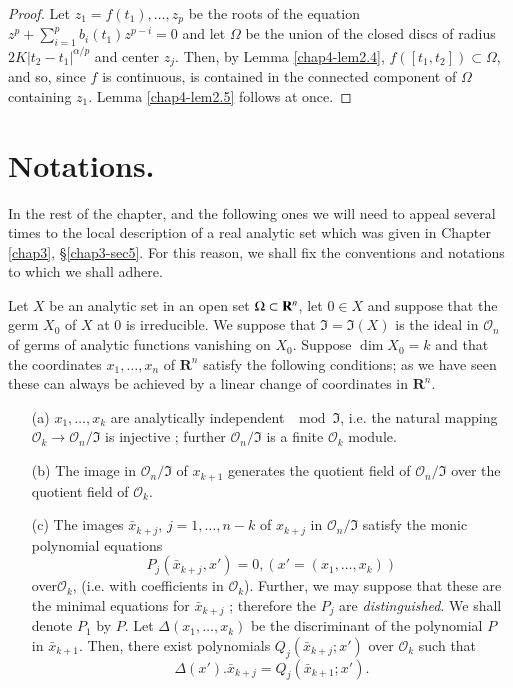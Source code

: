 \begin{proof}
Let $z_1 = f(t_1), \ldots, z_p$ be the roots of the equation $z^p + \sum\limits^p_{i=1} b_i (t_1) z^{p-i} =0$ and let $\Omega$ be the union of the closed discs of radius $2K |t_2 - t_1|^{\alpha/p}$ and center $z_j$. Then, by Lemma \ref{chap4-lem2.4}, $f([t_1, t_2]) \subset \Omega$, and so, since $f$ is continuous, is contained in the connected component of $\Omega$ containing $z_1$. Lemma \ref{chap4-lem2.5} follows at once.
\end{proof}

\section{Notations.} In the rest of the chapter, and the following ones we will need to appeal several times to the local description of a real analytic set which was given in Chapter \ref{chap3}, \S\ref{chap3-sec5}. For this reason, we shall fix the conventions and notations to which we shall adhere.

Let $X$ be an analytic set in an open set $\Omega \subset \mathbf{R}^n$, let $0 \in X$ and suppose that the germ $X_0$ of $X$ at 0 is irreducible. We suppose that $\mathfrak{I} = \mathfrak{I}(X)$ is the ideal in $\mathcal{O}_n$ of germs of analytic functions vanishing on $X_0$. Suppose $\dim X_0 =k$ and that the coordinates $x_1, \ldots, x_n$ of $\mathbf{R}^n$ satisfy the following conditions; as we have seen these can always be achieved by a linear change of coordinates in $\mathbf{R}^n$.
\begin{enumerate}
\item[(a)] $x_1, \ldots, x_k$ are analytically independent $\mod \mathfrak{I}$, i.e. the natural mapping $\mathcal{O}_k \to \mathcal{O}_n/\mathfrak{I}$ is injective ; further $\mathcal{O}_n/\mathfrak{I}$ is a finite $\mathcal{O}_k$ module.

\item[(b)] The image in $\mathcal{O}_n/\mathfrak{I}$ of $x_{k+1}$ generates the quotient field of $\mathcal{O}_n/\mathfrak{I}$ over the quotient field of $\mathcal{O}_k$.

\item[(c)] The images $\bar{x}_{k+j}$, $j=1, \ldots, n -k$ of $x_{k+j}$ in $\mathcal{O}_n/\mathfrak{I}$ satisfy the monic polynomial equations
  $$
P_j (\bar{x}_{k+j}, x') = 0, (x' = (x_1, \ldots, x_k))
$$
over\pageoriginale $\mathcal{O}_k$, (i.e. with coefficients in $\mathcal{O}_k$). Further, we may suppose that these are the minimal equations for $\bar{x}_{k+j}$ ; therefore the $P_j$ are \textit{distinguished}. We shall denote $P_1$ by $P$. Let $\Delta (x_1, \ldots, x_k)$ be the discriminant of the polynomial $P$ in $\bar{x}_{k+1}$. Then, there exist polynomials $Q_j (\bar{x}_{k+j} ; x')$ over $\mathcal{O}_k$ such that
$$
\Delta (x'). \bar{x}_{k+j} = Q_j (\bar{x}_{k+1} ; x').
$$
\end{enumerate}

